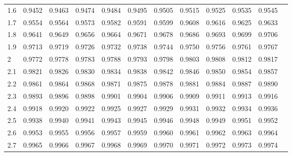 \begin{table}[!htbp]
\begin{tabularx}{\linewidth}{@{}BYZYZYZYZYZY@{}}
            1.6 & 0.9452     & 0.9463        & 0.9474        & 0.9484        & 0.9495        & 0.9505        & 0.9515        & 0.9525        & 0.9535        & 0.9545        \\
            1.7 & 0.9554     & 0.9564        & 0.9573        & 0.9582        & 0.9591        & 0.9599        & 0.9608        & 0.9616        & 0.9625        & 0.9633        \\
            1.8 & 0.9641     & 0.9649        & 0.9656        & 0.9664        & 0.9671        & 0.9678        & 0.9686        & 0.9693        & 0.9699        & 0.9706        \\
            1.9 & 0.9713     & 0.9719        & 0.9726        & 0.9732        & 0.9738        & 0.9744        & 0.9750        & 0.9756        & 0.9761        & 0.9767        \\
            2   & 0.9772     & 0.9778        & 0.9783        & 0.9788        & 0.9793        & 0.9798        & 0.9803        & 0.9808        & 0.9812        & 0.9817        \\
            2.1 & 0.9821     & 0.9826        & 0.9830        & 0.9834        & 0.9838        & 0.9842        & 0.9846        & 0.9850        & 0.9854        & 0.9857        \\
            2.2 & 0.9861     & 0.9864        & 0.9868        & 0.9871        & 0.9875        & 0.9878        & 0.9881        & 0.9884        & 0.9887        & 0.9890        \\
            2.3 & 0.9893     & 0.9896        & 0.9898        & 0.9901        & 0.9904        & 0.9906        & 0.9909        & 0.9911        & 0.9913        & 0.9916        \\
            2.4 & 0.9918     & 0.9920        & 0.9922        & 0.9925        & 0.9927        & 0.9929        & 0.9931        & 0.9932        & 0.9934        & 0.9936        \\
            2.5 & 0.9938     & 0.9940        & 0.9941        & 0.9943        & 0.9945        & 0.9946        & 0.9948        & 0.9949        & 0.9951        & 0.9952        \\
            2.6 & 0.9953     & 0.9955        & 0.9956        & 0.9957        & 0.9959        & 0.9960        & 0.9961        & 0.9962        & 0.9963        & 0.9964        \\
            2.7 & 0.9965     & 0.9966        & 0.9967        & 0.9968        & 0.9969        & 0.9970        & 0.9971        & 0.9972        & 0.9973        & 0.9974        \\

\end{tabularx}
\end{table}
